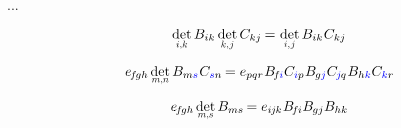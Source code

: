 ...


\nopagebreak\vspace{-0.2em}\begin{equation}\label{determinantofmatrixproduct}
\underset{\raisebox{.15em}{\scalebox{.7}{$i$,$k$}}}{\operatorname{det}} \, \somematrixelements{ik} \hspace{.4ex} \underset{\raisebox{.15em}{\scalebox{.7}{$k$,$\hspace{.15ex}j$}}}{\operatorname{det}} \, C_{kj} \hspace{-0.15ex}
= \hspace{.1ex} \underset{\raisebox{.15em}{\scalebox{.7}{$i$,$\hspace{.15ex}j$}}}{\operatorname{det}} \, \somematrixelements{ik} \hspace{.1ex} C_{kj}
\end{equation}

\[
e_{\hspace{-0.25ex}f\hspace{-0.2ex}gh} \hspace{.33ex} \underset{\raisebox{.15em}{\scalebox{.7}{$m$,$n$}}}{\operatorname{det}} \, \somematrixelements{m\mathcolor{blue}{s}} \hspace{.1ex} C_{\mathcolor{blue}{s}n} \hspace{-0.2ex}
= e_{pqr} \hspace{.1ex} \somematrixelements{\hspace{-0.25ex}f\hspace{-0.1ex}\mathcolor{blue}{i}} C_{\mathcolor{blue}{i}p} \hspace{.1ex} \somematrixelements{\hspace{-0.1ex}g\mathcolor{blue}{j}} C_{\hspace{-0.1ex}\mathcolor{blue}{j}\hspace{-0.1ex}q} \hspace{.1ex} \somematrixelements{h\mathcolor{blue}{k}} C_{\mathcolor{blue}{k}r}
\hspace{-0.2ex}
\]

\[
e_{\hspace{-0.25ex}f\hspace{-0.2ex}gh} \hspace{.33ex} \underset{\raisebox{.15em}{\scalebox{.7}{$m$,$s$}}}{\operatorname{det}} \, \somematrixelements{ms} \hspace{-0.2ex}
= e_{i\hspace{-0.1ex}j\hspace{-0.1ex}k} \hspace{.1ex} \somematrixelements{\hspace{-0.25ex}f\hspace{-0.1ex}i} \somematrixelements{\hspace{-0.1ex}gj} \somematrixelements{hk}
\hspace{-0.2ex}
\]

